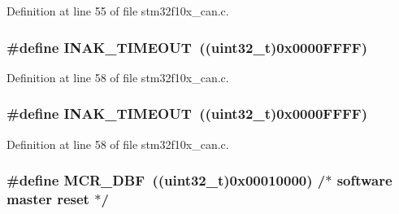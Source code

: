 Definition at line 55 of file stm32f10x\+\_\+can.\+c.

\subsubsection[{\texorpdfstring{I\+N\+A\+K\+\_\+\+T\+I\+M\+E\+O\+UT}{INAK_TIMEOUT}}]{\setlength{\rightskip}{0pt plus 5cm}\#define I\+N\+A\+K\+\_\+\+T\+I\+M\+E\+O\+UT~(({\bf uint32\+\_\+t})0x0000\+F\+F\+F\+F)}\hypertarget{group___c_a_n___private___defines_ga60a32132df242146efd3e9f7a079f0f0}{}\label{group___c_a_n___private___defines_ga60a32132df242146efd3e9f7a079f0f0}


Definition at line 58 of file stm32f10x\+\_\+can.\+c.

\subsubsection[{\texorpdfstring{I\+N\+A\+K\+\_\+\+T\+I\+M\+E\+O\+UT}{INAK_TIMEOUT}}]{\setlength{\rightskip}{0pt plus 5cm}\#define I\+N\+A\+K\+\_\+\+T\+I\+M\+E\+O\+UT~(({\bf uint32\+\_\+t})0x0000\+F\+F\+F\+F)}\hypertarget{group___c_a_n___private___defines_ga60a32132df242146efd3e9f7a079f0f0}{}\label{group___c_a_n___private___defines_ga60a32132df242146efd3e9f7a079f0f0}


Definition at line 58 of file stm32f10x\+\_\+can.\+c.

\subsubsection[{\texorpdfstring{M\+C\+R\+\_\+\+D\+BF}{MCR_DBF}}]{\setlength{\rightskip}{0pt plus 5cm}\#define M\+C\+R\+\_\+\+D\+BF~(({\bf uint32\+\_\+t})0x00010000) /$\ast$ software master reset $\ast$/}\hypertarget{group___c_a_n___private___defines_ga1ded3736beb63c49281f2983fc68c36d}{}\label{group___c_a_n___private___defines_ga1ded3736beb63c49281f2983fc68c36d}


